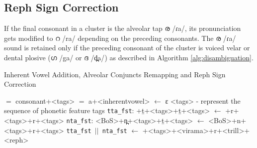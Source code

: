
\subsection{Reph Sign Correction}

If the final consonant in a cluster is the alveolar tap {\mal ര} {\ipa /ɾa/},
its pronunciation gets modified to {\mal റ} {\ipa /ra/} depending on the
preceding consonants. The {\mal ര} {\ipa /ɾa/} sound is retained only if the
preceding consonant of the cluster is voiced velar or dental plosive ({\mal ഗ}
	{\ipa /ga/} or {\mal ദ} {\ipa /d̪a/}) as described in Algorithm
\ref{alg:disambiguation}.


\begin{algorithm}[htpb]
	\caption{Inherent Vowel Addition, Alveolar Conjuncts Remapping and Reph Sign Correction}\label{alg:disambiguation}
	\begin{algorithmic}[1]
         $=$ {\ipa consonant+<tags>} 
		 $=$ {} 
		\State {} {\ipa a+<inherentvowel>} {} $\gets$ {}  {\ipa ɛ } {\ipa [post\_context]}
	\EndProcedure  \Comment <tags> - represent the sequence of phonetic feature tags
		\State \texttt{tta\_fst}: {+ṯ+<tags>+ṯ+<tags>} $\gets$ {+r+<tags>+r+<tags>}
		\State \texttt{nta\_fst}: {\ipa <BoS>+n̪+<tags>+ṯ+<tags>} $\gets$ {\ipa <BoS>+n+<tags>+r+<tags>}
		\State \Return \texttt{tta\_fst $||$ nta\_fst} 
		\EndProcedure
		\State {} $\gets$ {\ipa [ɡ,d̪]+<tags>+<virama>+r+<trill>+<reph>}
	\EndProcedure
	\end{algorithmic}
\end{algorithm}



